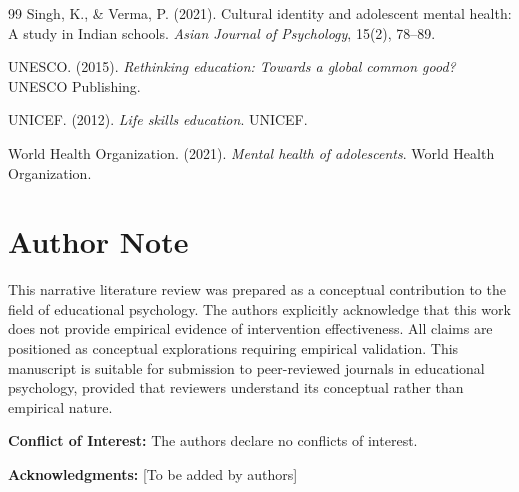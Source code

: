 \documentclass[12pt,a4paper,twocolumn]{article}
\begin{document}
\begin{thebibliography}{99}
Singh, K., \& Verma, P. (2021). Cultural identity and adolescent mental health: A study in Indian schools. \textit{Asian Journal of Psychology}, 15(2), 78--89.

UNESCO. (2015). \textit{Rethinking education: Towards a global common good?} UNESCO Publishing.

UNICEF. (2012). \textit{Life skills education}. UNICEF.

World Health Organization. (2021). \textit{Mental health of adolescents}. World Health Organization.

\end{thebibliography}

\newpage

\section*{Author Note}

This narrative literature review was prepared as a conceptual contribution to the field of educational psychology. The authors explicitly acknowledge that this work does not provide empirical evidence of intervention effectiveness. All claims are positioned as conceptual explorations requiring empirical validation. This manuscript is suitable for submission to peer-reviewed journals in educational psychology, provided that reviewers understand its conceptual rather than empirical nature.

\vspace{0.2cm}

\textbf{Conflict of Interest:} The authors declare no conflicts of interest.

\vspace{0.2cm}

\textbf{Acknowledgments:} [To be added by authors]
\end{document}
